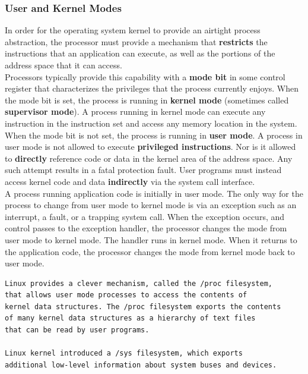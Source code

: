\documentclass[11pt]{article}
\begin{document}
\subsubsection{User and Kernel Modes}
\label{sec:org7082530}
In order for the operating system kernel to provide an airtight process abstraction, the processor must provide a mechanism that \textbf{restricts} the instructions that an application can execute, as well as the portions of the address space that it can access.\\


Processors typically provide this capability with a \textbf{mode bit} in some control register that characterizes the privileges that the process currently enjoys. When the mode bit is set, the process is running in \textbf{kernel mode} (sometimes called \textbf{supervisor mode}). A process running in kernel mode can execute any instruction in the instruction set and access any memory location in the system.\\

When the mode bit is not set, the process is running in \textbf{user mode}. A process in user mode is not allowed to execute \textbf{privileged instructions}. Nor is it allowed to \textbf{directly} reference code or data in the kernel area of the address space. Any such attempt results in a fatal protection fault. User programs must instead access kernel code and data \textbf{indirectly} via the system call interface.\\

A process running application code is initially in user mode. The only way for the process to change from user mode to kernel mode is via an exception such as an interrupt, a fault, or a trapping system call. When the exception occurs, and control passes to the exception handler, the processor changes the mode from user mode to kernel mode. The handler runs in kernel mode. When it returns to the application code, the processor changes the mode from kernel mode back to user mode.\\



\begin{verbatim}
Linux provides a clever mechanism, called the /proc filesystem, 
that allows user mode processes to access the contents of 
kernel data structures. The /proc filesystem exports the contents 
of many kernel data structures as a hierarchy of text files 
that can be read by user programs. 

Linux kernel introduced a /sys filesystem, which exports 
additional low-level information about system buses and devices.
\end{verbatim}
\end{document}

